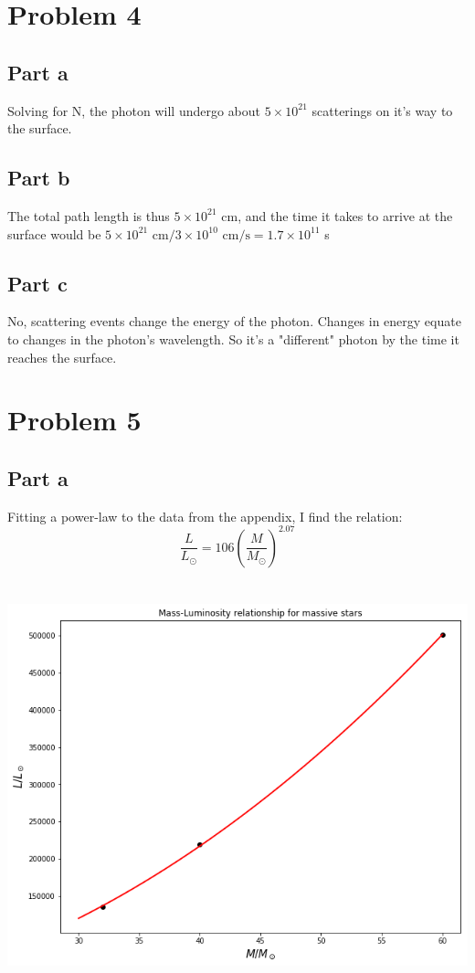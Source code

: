 \documentclass[a4paper, 11pt]{article}
\begin{document}
\section*{Problem 4}
	\subsection*{Part a}
		Solving for N, the photon will undergo about $5\times10^{21}$ scatterings on it's way to the surface. 
	\subsection*{Part b}
		The total path length is thus $5\times10^{21}$ cm, and the time it takes to arrive at the surface would 
		be $5\times10^{21} \text{ cm}/3\times10^{10} \text{ cm/s} = 1.7\times10^{11}$ s
	\subsection*{Part c}
		No, scattering events change the energy of the photon. Changes in energy equate to changes in the 
		photon's wavelength. So it's a "different" photon by the time it reaches the surface. 
\section*{Problem 5}
	\subsection*{Part a}
		Fitting a power-law to the data from the appendix, I find the relation:
		\begin{equation*}
			\frac{L}{L_\odot} = 106\left(\frac{M}{M_\odot}\right)^{2.07}
		\end{equation*}
		\ \\ \\
		\includegraphics[width=15cm]{problem5.png}
		\ \\ \\
\end{document}
